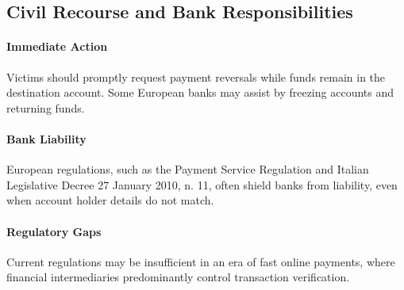 \subsection{Civil Recourse and Bank Responsibilities}
\paragraph{Immediate Action} Victims should promptly request payment reversals
while funds remain in the destination account. Some European banks may assist
by freezing accounts and returning funds.

\paragraph{Bank Liability} European regulations, such as the Payment Service
Regulation and Italian Legislative Decree 27 January 2010, n. 11, often shield
banks from liability, even when account holder details do not match.

\paragraph{Regulatory Gaps} Current regulations may be insufficient in an era
of fast online payments, where financial intermediaries predominantly control
transaction verification.


